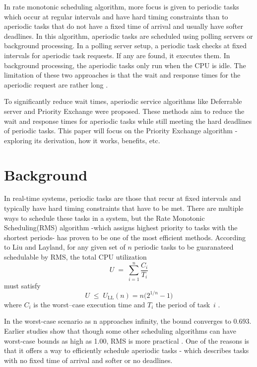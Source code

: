 \documentclass[conference]{IEEEtran}
\begin{document}
In rate monotonic scheduling algorithm, more focus is given to periodic tasks which occur at regular intervals and have hard timing constraints than to aperiodic tasks that do not have a fixed time of arrival and usually have softer deadlines. In this algorithm, aperiodic tasks are scheduled using polling servers or background processing. In a polling server setup, a periodic task checks at fixed intervals for aperiodic task requests. If any are found, it executes them. In background processing, the aperiodic tasks only run when the CPU is idle. The limitation of these two approaches is that the wait and response times for the aperiodic request are rather long \cite{sprunt1990aperiodic}.

To significantly reduce wait times, aperiodic service algorithms like Deferrable server and Priority Exchange were proposed. These methods aim to reduce the wait and response times for aperiodic tasks while still meeting the hard deadlines of periodic tasks. This paper will focus on the Priority Exchange algorithm - exploring its derivation, how it works, benefits, etc.\ \cite{lehoczky1987enhanced}

\section{Background}
In real-time systems, periodic tasks are those that recur at fixed intervals and typically have hard timing constraints that have to be met. There are multiple ways to schedule these tasks in a system, but the Rate Monotonic Scheduling(RMS) algorithm -which assigns highest priority to tasks with the shortest periods- has proven to be one of the most efficient methods. According to Liu and Layland, for any given set of $n$  periodic tasks to be guaranateed schedulable by RMS, the total CPU utilization 
\begin{equation}
  U \;=\; \sum_{i=1}^{n} \frac{C_i}{T_i}
  \label{eq:utilization}
\end{equation}
must satisfy
\begin{equation}
  U \;\le\; U_{\mathrm{LL}}(n)
  = n\bigl(2^{1/n}-1\bigr)
  \label{eq:ll-bound}
\end{equation}
where $C_i$ is the worst–case execution time and $T_i$ the period of task~$i$ \cite{liu1973scheduling}.

In the worst-case scenario as n approaches infinity, the bound converges to 0.693. Earlier studies show that though some other scheduling algorithms can have worst-case bounds as high as 1.00, RMS is more practical \cite{lehoczky1989rate}. One of the reasons is that it offers a way to efficiently schedule aperiodic tasks - which describes tasks with no fixed time of arrival and softer or no deadlines.
\end{document}
